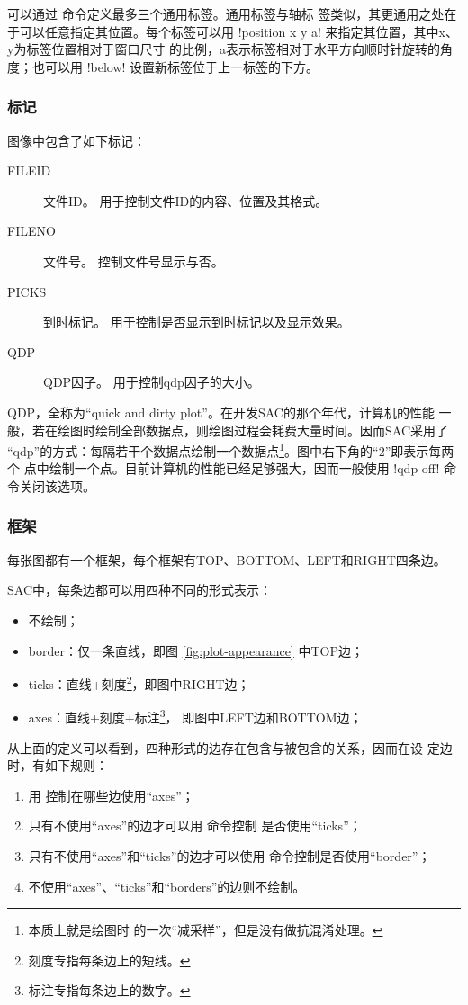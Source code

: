 可以通过  命令定义最多三个通用标签。通用标签与轴标
签类似，其更通用之处在于可以任意指定其位置。每个标签可以用
!position x y a! 来指定其位置，其中x、y为标签位置相对于窗口尺寸
的比例，a表示标签相对于水平方向顺时针旋转的角度；也可以用 !below!
设置新标签位于上一标签的下方。

\subsubsection{标记}
图像中包含了如下标记：
\begin{description}
\item [FILEID] 文件ID。 用于控制文件ID的内容、位置及其格式。
\item [FILENO] 文件号。 控制文件号显示与否。
\item [PICKS] 到时标记。 用于控制是否显示到时标记以及显示效果。
\item [QDP] QDP因子。 用于控制qdp因子的大小。
\end{description}

QDP，全称为``quick and dirty plot''。在开发SAC的那个年代，计算机的性能
一般，若在绘图时绘制全部数据点，则绘图过程会耗费大量时间。因而SAC采用了
``qdp''的方式：每隔若干个数据点绘制一个数据点\footnote{本质上就是绘图时
的一次``减采样''，但是没有做抗混淆处理。}。图中右下角的``2''即表示每两个
点中绘制一个点。目前计算机的性能已经足够强大，因而一般使用 !qdp off!
命令关闭该选项。

\subsubsection{框架}
每张图都有一个框架，每个框架有TOP、BOTTOM、LEFT和RIGHT四条边。

SAC中，每条边都可以用四种不同的形式表示：
\begin{itemize}
\item 不绘制；
\item border：仅一条直线，即图 \ref{fig:plot-appearance} 中TOP边；
\item ticks：直线+刻度\footnote{刻度专指每条边上的短线。}，即图中RIGHT边；
\item axes：直线+刻度+标注\footnote{标注专指每条边上的数字。}，
    即图中LEFT边和BOTTOM边；
\end{itemize}

从上面的定义可以看到，四种形式的边存在包含与被包含的关系，因而在设
定边时，有如下规则：
\begin{enumerate}
\item 用  控制在哪些边使用``axes''；
\item 只有不使用``axes''的边才可以用  命令控制
    是否使用``ticks''；
\item 只有不使用``axes''和``ticks''的边才可以使用 
    命令控制是否使用``border''；
\item 不使用``axes''、``ticks''和``borders''的边则不绘制。
\end{enumerate}

